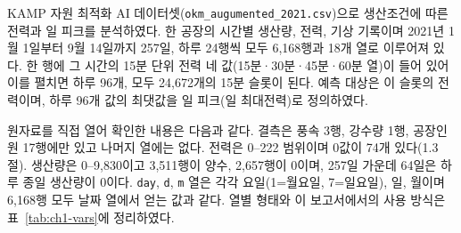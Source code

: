 

KAMP 자원 최적화 AI 데이터셋(\texttt{okm\_augumented\_2021.csv})으로 생산조건에 따른 전력과 일 피크를 분석하였다. 한 공장의 시간별 생산량, 전력, 기상 기록이며 2021년 1월 1일부터 9월 14일까지 257일, 하루 24행씩 모두 6,168행과 18개 열로 이루어져 있다. 한 행에 그 시간의 15분 단위 전력 네 값(15분·30분·45분·60분 열)이 들어 있어 이를 펼치면 하루 96개, 모두 24,672개의 15분 슬롯이 된다. 예측 대상은 이 슬롯의 전력이며, 하루 96개 값의 최댓값을 일 피크(일 최대전력)로 정의하였다.

원자료를 직접 열어 확인한 내용은 다음과 같다. 결측은 풍속 3행, 강수량 1행, 공장인원 17행에만 있고 나머지 열에는 없다. 전력은 0--222 범위이며 0값이 74개 있다(1.3절). 생산량은 0--9,830이고 3,511행이 양수, 2,657행이 0이며, 257일 가운데 64일은 하루 종일 생산량이 0이다. \texttt{day}, \texttt{d}, \texttt{m} 열은 각각 요일(1=월요일, 7=일요일), 일, 월이며 6,168행 모두 날짜 열에서 얻는 값과 같다. 열별 형태와 이 보고서에서의 사용 방식은 표~\ref{tab:ch1-vars}에 정리하였다.

